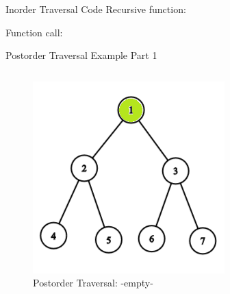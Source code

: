 \documentclass[aspectratio=169]{beamer}%
\begin{document}
\begin{frame}{Inorder Traversal Code}
    Recursive function:
    
    Function call:
    
\end{frame}

\begin{frame}{Postorder Traversal Example Part 1}
    \begin{columns}
        \begin{column}{0.32\textwidth}
            \begin{figure}
                \centering
                \includegraphics[width = .9\linewidth]{tree-post 1.png}
                \caption{Postorder Traversal: -empty-}
            \end{figure}
        \end{column}
        \hfill
        \begin{column}{0.32\textwidth}
            \begin{figure}
                \centering

\end{figure}
\end{column}
\end{columns}
\end{frame}
\end{document}
